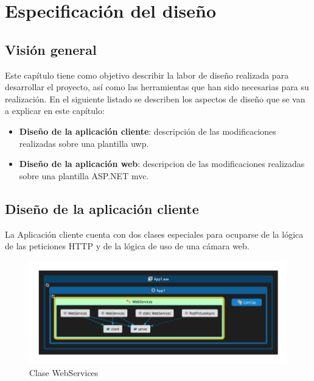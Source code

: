 \chapter{Especificación del diseño}\label{chap:design}

\section{Visión general}

Este capítulo tiene como objetivo describir la labor de diseño realizada para desarrollar el proyecto, así como las herramientas que han sido necesarias para su realización. En el siguiente listado se describen los aspectos de diseño que se van a explicar en este capítulo:

\begin{itemize}
	\item \textbf{Diseño de la aplicación cliente}: descripción de las modificaciones realizadas sobre una plantilla \acrshort{uwp}.
	\item \textbf{Diseño de la aplicación web}: descripcion de las modificaciones realizadas sobre una plantilla ASP.NET \acrshort{mvc}.

\end{itemize}

\section{Diseño de la aplicación cliente}

La Aplicación cliente cuenta con dos clases especiales para ocuparse de la lógica de las peticiones HTTP y de la lógica de uso de una cámara web.

\begin{figure}[!htbp]
	\centering
	\includegraphics[angle=90, scale=1.0]{fig/WebServices}
	\caption{Clase WebServices}
\end{figure}

\FloatBarrier


